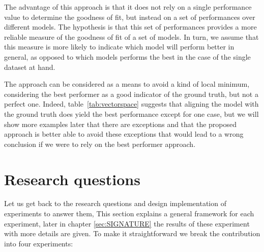 The advantage of this approach is that it does not rely on a single performance value to determine the goodness of fit, but instead on a set of performances over different models. The hypothesis is that this set of performances provides a more reliable measure of the goodness of fit of a set of models. In turn, we assume that this measure is more likely to indicate which model will perform better in general, as opposed to which models performs the best in the case of the single dataset at hand.

The approach can be considered as a means to avoid a kind of local minimum, considering the best performer as a good indicator of the ground truth, but not a perfect one. Indeed, table~\ref{tab:vectorspace} suggests that aligning the model with the ground truth does yield the best performance except for one case, but we will show more examples later that there are exceptions and that the proposed approach is better able to avoid these exceptions that would lead to a wrong conclusion if we were to rely on the best performer approach.

\section{Research questions}

Let us get back to the research questions and design implementation of experiments to answer them, This section explains a general framework for each experiment, later in chapter \ref{sec:SIGNATURE} the results of these experiment with more details are given. To make it straightforward we break the contribution into four experiments:

